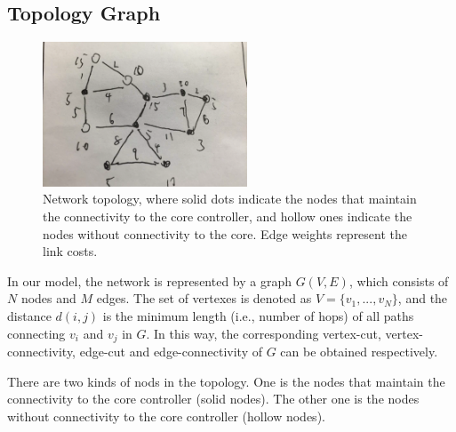\documentclass[conference]{IEEEtran}
\begin{document}
\subsection{Topology Graph}
\begin{figure}
\centering
\includegraphics[width=2.4in]{model}
\caption{Network topology, where solid dots indicate the nodes that maintain the connectivity to the core controller, and hollow ones indicate the nodes without connectivity to the core. Edge weights represent the link costs.}
\label{model}
\end{figure}
In our model, the network is represented by a graph $G(V,E)$, which consists of $N$ nodes and $M$ edges. The set of vertexes is denoted as $V = \{v_1,...,v_N\}$, and the distance $d(i,j)$ is the minimum length (i.e., number of hops) of all paths connecting $v_i$ and $v_j$ in $G$. In this way, the corresponding vertex-cut, vertex-connectivity, edge-cut and edge-connectivity of $G$ can be obtained respectively.

There are two kinds of nods in the topology. One is the nodes that maintain the connectivity to the core controller (solid nodes). The other one is the nodes without connectivity to the core controller (hollow nodes).
\end{document}
